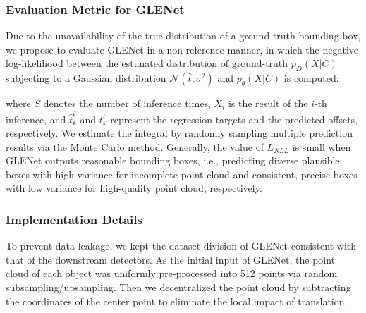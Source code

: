 \documentclass[twocolumn]{svjour3}
\begin{document}
\subsubsection{Evaluation Metric for GLENet}
Due to the unavailability of the true distribution of a ground-truth bounding box, we propose to evaluate GLENet in a non-reference manner, in which the negative log-likelihood between the estimated distribution of ground-truth $p_{D}(X \vert C)$ subjecting to a Gaussian distribution $\mathcal{N}(\hat{t}, \sigma^2)$ and $p_{\theta}(X \vert C)$ is computed:

\hspace{-0.7cm}

\noindent where $S$ denotes the number of inference times, $X_i$ is the result of the $i$-th inference, and $\hat{t}_k^{i}$ and $t_k^i$ represent the regression targets and the predicted offsets, respectively. We estimate the integral by randomly sampling multiple prediction results via the Monte Carlo method.
Generally, the value of $L_{NLL}$ is small when GLENet outputs reasonable bounding boxes, i.e., predicting diverse plausible boxes with high variance for incomplete point cloud and consistent, precise boxes with low variance for high-quality point cloud, respectively.

\subsubsection{Implementation Details} 
\label{sec:imple details}
To prevent data leakage, we kept the dataset division of GLENet consistent with that of the downstream detectors. 
As the initial input of GLENet, the point cloud of each object was uniformly pre-processed into 512 points via random subsampling/upsampling. Then we decentralized the point cloud by subtracting the coordinates of the center point to eliminate the local impact of translation.
\end{document}
